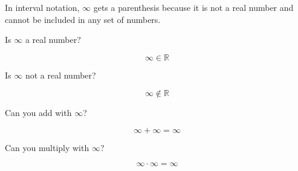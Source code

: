 \documentclass{ximera}
\begin{document}
In interval notation, $\infty$ gets a parenthesis because it is not a real number and cannot be included in any set of numbers.






\begin{question} 


Is $\infty$ a real number?

\[  \infty \in \mathbb{R}  \]


\begin{multipleChoice}
\end{multipleChoice}


\end{question}





\begin{question} 


Is $\infty$ not a real number?

\[  \infty \notin \mathbb{R}  \]


\begin{multipleChoice}
\end{multipleChoice}


\end{question}










\newpage


\begin{question} 


Can you add with $\infty$?

\[  \infty + \infty = \infty \]


\begin{multipleChoice}
\end{multipleChoice}


\end{question}










\begin{question} 


Can you multiply with $\infty$?

\[  \infty \cdot \infty = \infty \]


\begin{multipleChoice}
\end{multipleChoice}


\end{question}
\end{document}
